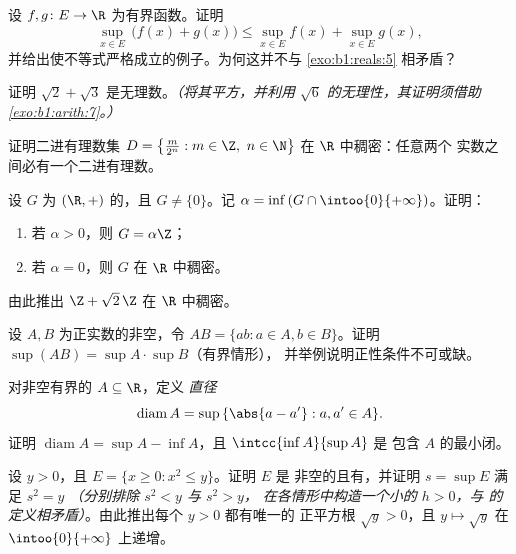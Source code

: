 \begin{exercise}[$\star\star$]\label{exo:b1:reals:6}
设 $f, g \colon E \to \R$ 为有界函数。证明
\[
\sup_{x \in E}\, \bigl(f(x) + g(x)\bigr) \leq \sup_{x \in E} f(x) +
\sup_{x \in E} g(x),
\]
并给出使不等式严格成立的例子。为何这并不与
\cref{exo:b1:reals:5} 相矛盾？
\end{exercise}

\begin{exercise}[$\star\star$]\label{exo:b1:reals:7}
证明 $\sqrt 2 + \sqrt 3$ 是无理数。\emph{（将其平方，并利用
$\sqrt 6$ 的无理性，其证明须借助
\cref{exo:b1:arith:7}。）}
\end{exercise}

\begin{exercise}[$\star\star$]\label{exo:b1:reals:8}
证明二进有理数集 $D = \bigl\{\frac{m}{2^n} : m \in \Z,\ n \in
\N\bigr\}$ 在 $\R$ 中稠密：任意两个
实数之间必有一个二进有理数。
\end{exercise}

\begin{exercise}[$\star\star\star$]\label{exo:b1:reals:9}
设 $G$ 为 $(\R, +)$ 的，且 $G \neq \{0\}$。记 $\alpha =
\inf\,(G \cap \intoo{0}{+\infty})$。证明：
\begin{enumerate}
  \item 若 $\alpha > 0$，则 $G = \alpha\Z$；
  \item 若 $\alpha = 0$，则 $G$ 在 $\R$ 中稠密。
\end{enumerate}
由此推出 $\Z + \sqrt 2\,\Z$ 在 $\R$ 中稠密。
\end{exercise}

\begin{exercise}[$\star\star\star$]\label{exo:b1:reals:10}
设 $A, B$ 为正实数的非空，令 $AB = \{ab : a \in
A, b \in B\}$。证明 $\sup(AB) = \sup A \cdot \sup B$（有界情形），
并举例说明正性条件不可或缺。
\end{exercise}

\begin{exercise}[$\star\star$]\label{exo:b1:reals:11}
对非空有界的 $A \subseteq \R$，定义
\emph{直径}
\[
\operatorname{diam} A = \sup\,\{\abs{a - a'} : a, a' \in A\} .
\]
证明 $\operatorname{diam} A = \sup A - \inf A$，且
$\intcc{\inf A}{\sup A}$ 是
包含 $A$ 的最小闭。
\end{exercise}

\begin{exercise}[$\star\star\star$]\label{exo:b1:reals:12}
设 $y > 0$，且 $E = \{x \geq 0 : x^2 \leq y\}$。证明 $E$ 是
非空的且有，并证明 $s = \sup E$ 满足 $s^2 =
y$ \emph{（分别排除 $s^2 < y$ 与 $s^2 > y$，
在各情形中构造一个小的 $h > 0$，与
的定义相矛盾）}。由此推出每个 $y > 0$ 都有唯一的
正平方根 $\sqrt y > 0$，且 $y \mapsto \sqrt y$ 在
$\intoo{0}{+\infty}$ 上递增。
\end{exercise}

